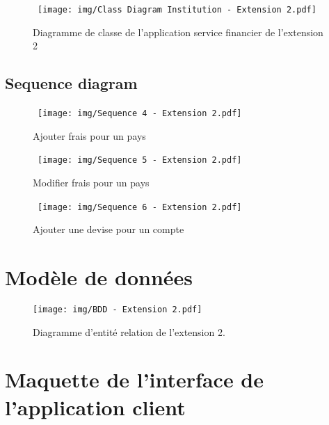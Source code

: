 \documentclass[]{report}
\begin{document}
\begin{figure}[h!]
	\hbox{
		\centering\texttt{[image: img/Class Diagram Institution - Extension 2.pdf]}
	}
	\caption{Diagramme de classe de l'application service financier de l'extension 2}
\end{figure}

\newpage

\subsection{Sequence diagram}

\begin{figure}[h!]
	\hbox{
		\centering\texttt{[image: img/Sequence 4 - Extension 2.pdf]}
	}
	\caption{Ajouter frais pour un pays}
	\end{figure}
	
\newpage

\begin{figure}[h!]
	\hbox{
		\centering\texttt{[image: img/Sequence 5 - Extension 2.pdf]}
	}
	\caption{Modifier frais pour un pays}
	\end{figure}
	
\newpage

\begin{figure}[h!]
	\hbox{
		\centering\texttt{[image: img/Sequence 6 - Extension 2.pdf]}
	}
	\caption{Ajouter une devise pour un compte}
\end{figure}

\newpage

\section{Modèle de données}

\begin{figure}[h]
	\centering\texttt{[image: img/BDD - Extension 2.pdf]}
	\caption{Diagramme d'entité relation de l'extension 2.}
\end{figure}


\newpage

\section{Maquette de l'interface de l'application client}


\end{document}
